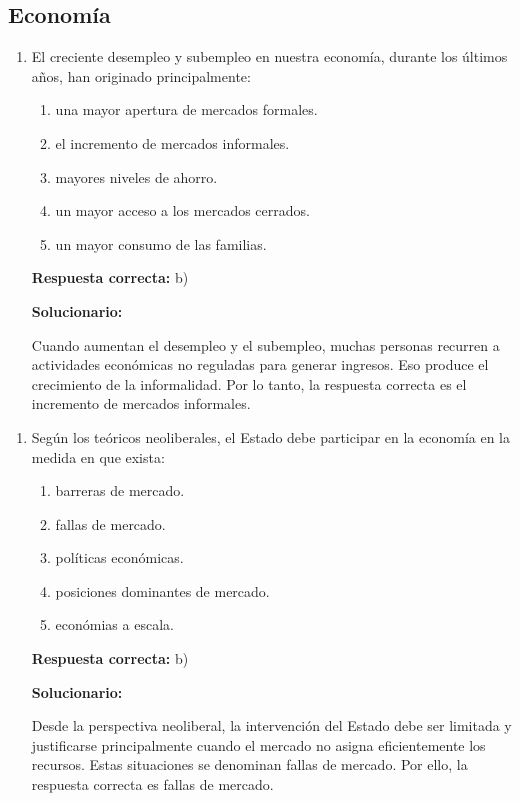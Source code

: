 \subsection*{Economía}

\begin{enumerate}[resume]
	
	\item El creciente desempleo y subempleo en nuestra economía, durante los últimos años, han originado principalmente:
	
	\begin{enumerate}[label=\alph*)]
		\item una mayor apertura de mercados formales.
		\item el incremento de mercados informales.
		\item mayores niveles de ahorro.
		\item un mayor acceso a los mercados cerrados.
		\item un mayor consumo de las familias.
	\end{enumerate}
	
	\textbf{Respuesta correcta:} b)
	
	\vspace{2mm}
	\textbf{Solucionario:}
	
	Cuando aumentan el desempleo y el subempleo, muchas personas recurren a actividades económicas no reguladas para generar ingresos. Eso produce el crecimiento de la informalidad. Por lo tanto, la respuesta correcta es el incremento de mercados informales.
	
\end{enumerate}

\begin{enumerate}[resume]
	
	\item Según los teóricos neoliberales, el Estado debe participar en la economía en la medida en que exista:
	
	\begin{enumerate}[label=\alph*)]
		\item barreras de mercado.
		\item fallas de mercado.
		\item políticas económicas.
		\item posiciones dominantes de mercado.
		\item económias a escala.
	\end{enumerate}
	
	\textbf{Respuesta correcta:} b)
	
	\vspace{2mm}
	\textbf{Solucionario:}
	
	Desde la perspectiva neoliberal, la intervención del Estado debe ser limitada y justificarse principalmente cuando el mercado no asigna eficientemente los recursos. Estas situaciones se denominan fallas de mercado. Por ello, la respuesta correcta es fallas de mercado.
	
\end{enumerate}



